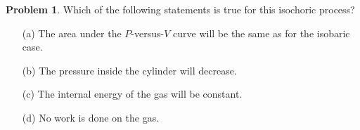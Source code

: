 \documentclass[10pt]{article}
\theoremstyle{definition} %
\newtheorem{problem}{Problem}
\theoremstyle{plain} %
\begin{document}
\begin{problem}
                                                Which of the following statements is true for this isochoric process?
                                                
                                                \begin{enumerate}
                                                  \item[(a)] The area under the \(P\)-versus-\(V\) curve will be the same as for the isobaric case.
                                                  \item[(b)] The pressure inside the cylinder will decrease.
                                                  \item[(c)] The internal energy of the gas will be constant.
                                                  \item[(d)] No work is done on the gas.
                                                \end{enumerate}
                                                \end{problem}
\end{document}

